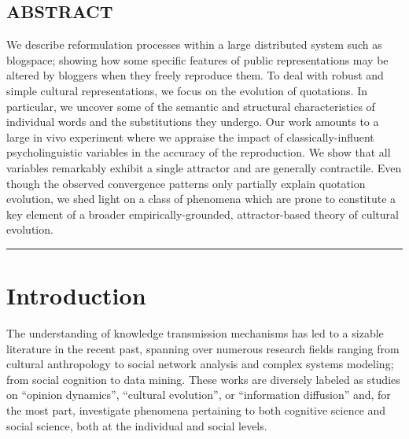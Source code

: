 
\subsection*{ABSTRACT}

We describe reformulation processes within a large distributed system such as blogspace; showing how some specific features of public representations may be altered by bloggers when they freely reproduce them. To deal with robust and simple cultural representations, we focus on the evolution of quotations.  In particular, we uncover some of the semantic and structural characteristics of individual words and the substitutions they undergo. Our work amounts to a large in vivo experiment where we appraise the impact of classically-influent psycholinguistic variables in the accuracy of the reproduction. We show that all variables remarkably exhibit a single attractor and are generally contractile. Even though the observed convergence patterns only partially explain quotation evolution, we shed light on a class of phenomena which are prone to constitute a key element of a broader empirically-grounded, attractor-based theory of cultural evolution.

\bigskip
\hrule

\section{Introduction} %

The understanding of knowledge transmission mechanisms has led to a sizable literature in the recent past, spanning over numerous research fields ranging from cultural anthropology to social network analysis and complex systems modeling; from social cognition to data mining. These works are diversely labeled as studies on ``opinion dynamics'', ``cultural evolution'', or ``information diffusion'' and, for the most part, investigate phenomena pertaining to both cognitive science and social science, both at the individual and social levels.

